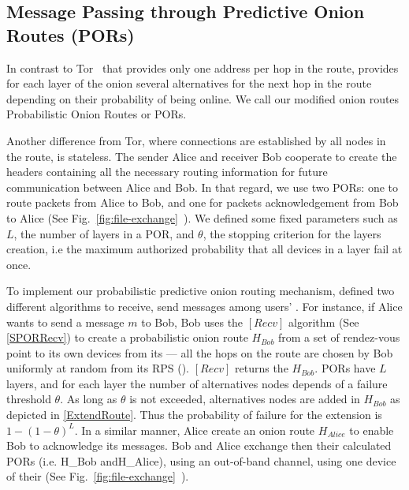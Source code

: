 
\subsection{Message Passing through Predictive Onion Routes (PORs)}
\label{sec:message_passing}


In contrast to Tor~\cite{Tor} that provides only one address per hop
in the route, \name provides for each layer of the onion several
alternatives for the next hop in the route depending on their
probability of being online. We call our modified onion routes
Probabilistic Onion Routes or PORs.

Another difference from Tor, where connections are established by all
nodes in the route, \name is stateless. The sender
Alice and receiver Bob cooperate to create the headers containing all
the necessary routing information for future communication between
Alice and Bob. In that regard, we use two PORs: one to route packets from Alice to
Bob, and one for packets acknowledgement from Bob to Alice (See
Fig.~\ref{fig:file-exchange}~). We defined some fixed
parameters such as $L$, the number of layers in a POR, and
$\theta$, the stopping criterion for the layers creation, i.e the
maximum authorized  probability that all devices in a layer fail at
once.

To implement our  probabilistic
predictive onion routing mechanism, \name defined two different algorithms to
receive, send messages among users' \squad. For instance,
if Alice wants to send a message \(m\) to Bob, Bob uses the
\([Recv]\) algorithm (See \cref{SPORRecv}) to create a probabilistic onion route \(H_{Bob}\) from
 a set of rendez-vous point to its own devices from its \squad --- all the hops on the route are 
chosen by Bob uniformly at random from its RPS (\view).
 \([Recv]\) returns the \(H_{Bob}\).
PORs have \(L\) layers, and for each layer the number of
alternatives nodes depends of a failure threshold \(\theta\). 
As long as \(\theta\) is not exceeded, alternatives nodes are added in
\(H_{Bob}\) as depicted in \cref{ExtendRoute}. Thus the probability of
failure for the extension is \(1 - (1 - \theta)^L\). In a similar
manner, Alice create an onion route \(H_{Alice}\) to enable Bob to
acknowledge its messages. Bob and Alice exchange then their calculated
PORs (i.e. H_{Bob} andH_{Alice}), using an
out-of-band channel, \eg using one device of their \squad (See
Fig.~\ref{fig:file-exchange}~).

